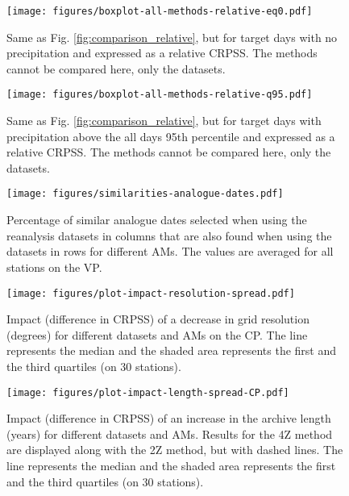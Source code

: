 \documentclass{ametsoc}
\begin{document}
\begin{figure}[t]
	\noindent\texttt{[image: figures/boxplot-all-methods-relative-eq0.pdf]}\\
	\caption{Same as Fig. \ref{fig:comparison_relative}, but for target days with no precipitation and expressed as a relative CRPSS. The methods cannot be compared here, only the datasets.}
	\label{fig:comparison_relative_P0}
\end{figure}

\begin{figure}[t]
	\noindent\texttt{[image: figures/boxplot-all-methods-relative-q95.pdf]}\\
	\caption{Same as Fig. \ref{fig:comparison_relative}, but for target days with precipitation above the all days 95th percentile and expressed as a relative CRPSS. The methods cannot be compared here, only the datasets.}
	\label{fig:comparison_relative_Pq95}
\end{figure}

\begin{figure}[t]
	\noindent\texttt{[image: figures/similarities-analogue-dates.pdf]}\\
	\caption{Percentage of similar analogue dates selected when using the reanalysis datasets in columns that are also found when using the datasets in rows for different AMs. The values are averaged for all stations on the VP.}
	\label{fig:similarities_analogue_dates}
\end{figure}

\begin{figure}[t]
	\noindent\texttt{[image: figures/plot-impact-resolution-spread.pdf]}\\
	\caption{Impact (difference in CRPSS) of a decrease in grid resolution (degrees) for different datasets and AMs on the CP. The line represents the median and the shaded area represents the first and the third quartiles (on 30 stations).}
	\label{fig:plot_impact_resolution}
\end{figure}

\begin{figure}[t]
	\noindent\texttt{[image: figures/plot-impact-length-spread-CP.pdf]}\\
	\caption{Impact (difference in CRPSS) of an increase in the archive length (years) for different datasets and AMs. Results for the 4Z method are displayed along with the 2Z method, but with dashed lines. The line represents the median and the shaded area represents the first and the third quartiles (on 30 stations).}
	\label{fig:plot_impact_length_CP}
\end{figure}
\end{document}
